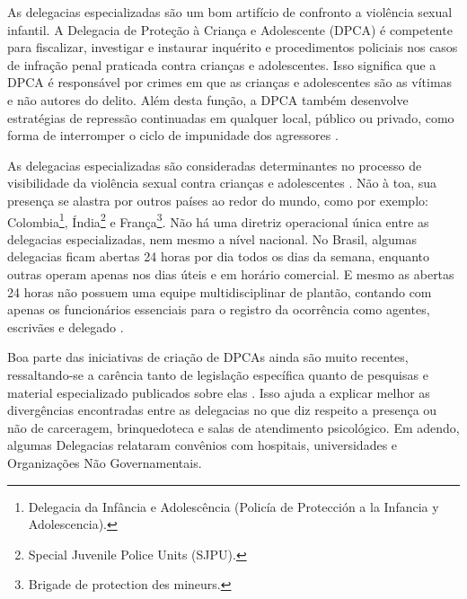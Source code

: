 As delegacias especializadas são um bom artifício de confronto a violência sexual infantil. A Delegacia de Proteção à Criança e Adolescente (DPCA) é competente para fiscalizar, investigar e instaurar inquérito e procedimentos policiais nos casos de infração penal praticada contra crianças e adolescentes. Isso significa que a DPCA é responsável por crimes em que as crianças e adolescentes são as vítimas e não autores do delito. Além desta função, a DPCA também desenvolve estratégias de repressão continuadas em qualquer local, público ou privado, como forma de interromper o ciclo de impunidade dos agressores \cite{rodrigues2014}. %

As delegacias especializadas são consideradas determinantes no processo de visibilidade da violência sexual contra crianças e adolescentes \cite{plano2013}. Não à toa, sua presença se alastra por outros países ao redor do mundo, como por exemplo: Colombia\footnote{Delegacia da Infância e Adolescência (Policía de Protección a la Infancia y Adolescencia).}, Índia\footnote{Special Juvenile Police Units (SJPU).} e França\footnote{Brigade de protection des mineurs.}.
Não há uma diretriz operacional única entre as delegacias especializadas, nem mesmo a nível nacional. No Brasil, algumas delegacias ficam abertas 24 horas por dia todos os dias da semana, enquanto outras operam apenas nos dias úteis e em horário comercial. E mesmo as abertas 24 horas não possuem uma equipe multidisciplinar de plantão, contando com apenas os funcionários essenciais para o registro da ocorrência como agentes, escrivães e delegado \cite{novo2016}. 

Boa parte das iniciativas de criação de DPCAs ainda são muito recentes, ressaltando-se a carência tanto de legislação específica quanto de pesquisas e material especializado publicados sobre elas \cite{novo2016}. Isso ajuda a explicar melhor as divergências encontradas entre as delegacias no que diz respeito a presença ou não de carceragem, brinquedoteca e salas de atendimento psicológico. 
Em adendo, algumas Delegacias relataram convênios com hospitais, universidades e Organizações Não Governamentais.

